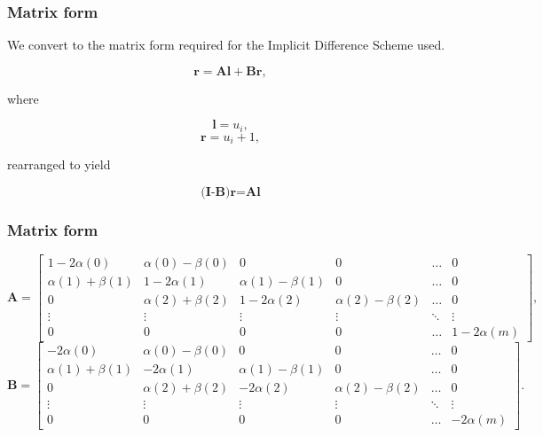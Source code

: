 \documentclass{beamer}
\begin{document}
  \begin{frame}
    \frametitle{Matrix form}
    We convert to the matrix form required for the Implicit Difference Scheme used.

    \begin{equation}
      \textbf{r} = \textbf{Al} + \textbf{Br},
    \end{equation}

    where

    \begin{equation}
      \textbf{l} = u_{i},
    \end{equation}
    \begin{equation}
      \textbf{r} = u_i+1,
    \end{equation}

    rearranged to yield

    \begin{equation}
      \textbf{(I-B)}\textbf{r} = \textbf{Al}
    \end{equation}

  \end{frame}

  \begin{frame}
    \frametitle{Matrix form}
    \tiny
    \begin{equation}
      \textbf{A} = \begin{bmatrix}
        1-2\alpha(0) & \alpha(0) - \beta(0) & 0 & 0 & \hdots & 0 \\
        \alpha(1) + \beta(1) & 1-2\alpha(1) & \alpha(1) - \beta(1) & 0 & \hdots & 0 \\
        0 & \alpha(2) + \beta(2) & 1-2\alpha(2) & \alpha(2) - \beta(2) & \hdots & 0 \\
        \vdots & \vdots & \vdots & \vdots & \ddots & \vdots \\
        0 & 0 & 0 & 0 & \hdots & 1-2\alpha(m)
      \end{bmatrix},
    \end{equation}
    \begin{equation}
      \textbf{B} = \begin{bmatrix}
        -2\alpha(0) & \alpha(0) - \beta(0) & 0 & 0 & \hdots & 0 \\
        \alpha(1) + \beta(1) & -2\alpha(1) & \alpha(1) - \beta(1) & 0 & \hdots & 0 \\
        0 & \alpha(2) + \beta(2) & -2\alpha(2) & \alpha(2) - \beta(2) & \hdots & 0 \\
        \vdots & \vdots & \vdots & \vdots & \ddots & \vdots \\
        0 & 0 & 0 & 0 & \hdots & -2\alpha(m)
      \end{bmatrix}.
    \end{equation}
  \end{frame}
\end{document}
